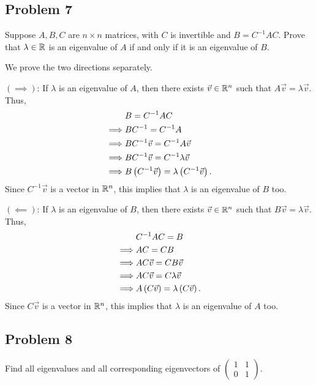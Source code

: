 \documentclass[main.tex]{subfiles}
\begin{document}
\subsection{Problem 7}
\begin{claim}
    Suppose $A, B, C$ are $n \times n$ matrices, with $C$ is invertible and $B = C^{-1}AC$. Prove that $\lambda \in \mathbb R$ is an eigenvalue of $A$ if and only if it is an eigenvalue of $B$.
\end{claim}

\begin{soln}
    We prove the two directions separately.
    
    $(\implies)$: If $\lambda$ is an eigenvalue of $A$, then there exists $\vec{v}\in \mathbb R^n$ such that $A\vec{v} = \lambda\vec{v}$. Thus,
    \begin{align*}
        &B = C^{-1}AC \\
        \implies& BC^{-1} = C^{-1}A \\
        \implies& BC^{-1}\vec{v} = C^{-1}A\vec{v} \\
        \implies& BC^{-1}\vec{v} = C^{-1}\lambda\vec{v} \\
        \implies& B\left( C^{-1}\vec{v} \right) = \lambda\left( C^{-1}\vec{v} \right).
    \end{align*}
    Since $C^{-1}\vec{v}$ is a vector in $\mathbb R^n$, this implies that $\lambda$ is an eigenvalue of $B$ too.
    
    $(\impliedby)$: If $\lambda$ is an eigenvalue of $B$, then there exists $\vec{v}\in \mathbb R^n$ such that $B\vec{v} = \lambda\vec{v}$. Thus,
    \begin{align*}
        &C^{-1}AC = B \\
        \implies& AC = CB \\
        \implies& AC\vec{v} = CB\vec{v} \\
        \implies& AC\vec{v} = C\lambda \vec{v} \\
        \implies& A\left( C\vec{v} \right) = \lambda \left( C\vec{v} \right).
    \end{align*}
    Since $C\vec{v}$ is a vector in $\mathbb R^n$, this implies that $\lambda$ is an eigenvalue of $A$ too.
\end{soln}
\eject

\subsection{Problem 8}
\begin{claim}
    Find all eigenvalues and all corresponding eigenvectors of $\begin{pmatrix}1 & 1 \\ 0 & 1\end{pmatrix}$.
\end{claim}
\end{document}

